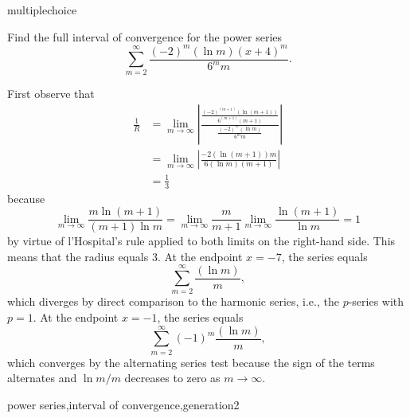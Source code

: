 \documentclass{ximera}
\begin{document}
\begin{question}[PowerSerInterval004]
\begin{type}
multiplechoice
\end{type}
Find the full interval of convergence for the power series \[\sum_{m=2}^{\infty} \frac{(-2)^m(\ln m)(x + 4)^m }{6^mm}.\]
\begin{multiplechoice}
\choice{\(\displaystyle \left[-\frac{13}{3},-\frac{11}{3}\right)\)}
\choice[correct]{\(\displaystyle \left(-7,-1\right]\)}
\choice{\(\displaystyle \left[-7,-1\right]\)}
\choice{\(\displaystyle \left(-\infty,\infty\right)\)}
\end{multiplechoice}
\begin{feedback}
First observe that 
\[\begin{aligned}
\frac{1}{R} & = \lim_{m\rightarrow \infty} \left| \frac{\frac{(-2)^{(m+1)}(\ln {(m+1)}) }{6^{(m+1)}{(m+1)}} }{\frac{(-2)^m(\ln m) }{6^mm}} \right| \\
& = \lim_{m\rightarrow \infty} \left| \frac{-2(\ln {(m+1)})m }{6(\ln m){(m+1)} } \right| \\
& = \frac{1}{3}
\end{aligned}\]
because \[\lim_{m \rightarrow \infty} \frac{m\ln (m+1)}{(m+1) \ln m} = \lim_{m \rightarrow \infty} \frac{m}{m+1} \lim_{m \rightarrow \infty} \frac{\ln (m+1)}{\ln m} = 1\] by virtue of l'Hospital's rule applied to both limits on the right-hand side.
This means that the radius equals \(3\). At the endpoint \(x=-7\), the series equals \[\sum_{m=2}^{\infty} \frac{(\ln m) }{m },\] which diverges by direct comparison to the harmonic series, i.e., the \(p\)-series with \(p = 1\). At the endpoint \(x=-1\), the series equals \[\sum_{m=2}^{\infty} (-1)^m\frac{(\ln m) }{m },\] which converges by the alternating series test because the sign of the terms alternates and \(\ln m / m\) decreases to zero as \(m \rightarrow \infty\).
\end{feedback}
\begin{keywords}
power series,interval of convergence,generation2
\end{keywords}
\end{question}
\end{document}
